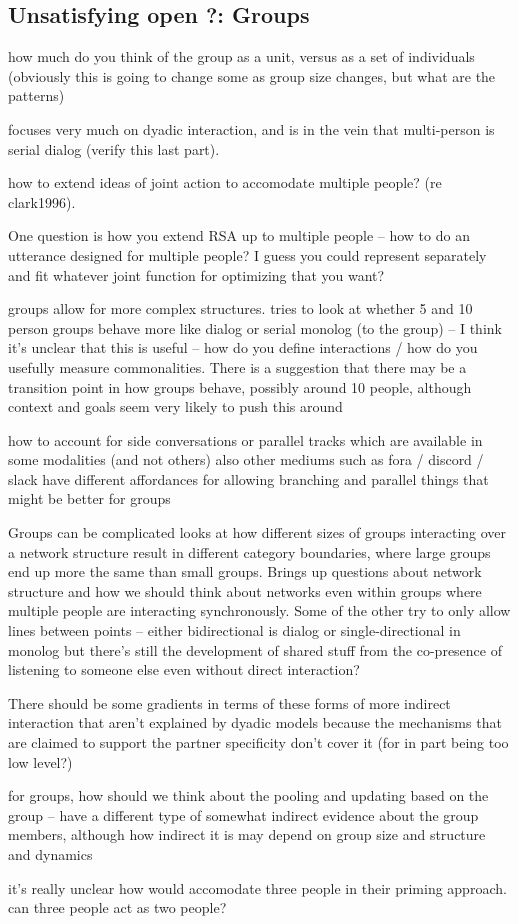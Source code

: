 \documentclass[]{article}
\begin{document}
\subsection{Unsatisfying open ?: Groups}


\cite{yoon2019} how much do you think of the group as a unit, versus as a set of individuals (obviously this is going to change some as group size changes, but what are the patterns) 

\cite{clark1996} focuses very much on dyadic interaction, and is in the vein that multi-person is serial dialog (verify this last part). 

how to extend ideas of joint action to accomodate multiple people? (re clark1996). 

One question is how you extend RSA up to multiple people -- how to do an utterance designed for multiple people? I guess you could represent separately and fit whatever joint function for optimizing that you want? 

groups allow for more complex structures. \cite{fay2000} tries to look at whether 5 and 10 person groups behave more like dialog or serial monolog (to the group) -- I think it's unclear that this is useful -- how do you define interactions / how do you usefully measure commonalities. There is a suggestion that there may be a transition point in how groups behave, possibly around 10 people, although context and goals seem very likely to push this around 

how to account for side conversations or parallel tracks which are available in some modalities (and not others) also other mediums such as fora / discord / slack have different affordances for allowing branching and parallel things that might be better for groups 

Groups can be complicated \cite{guilbeault2021} looks at how different sizes of groups interacting over a network structure result in different category boundaries, where large groups end up more the same than small groups. Brings up questions about network structure and how we should think about networks even within groups where multiple people are interacting synchronously. Some of the other try to only allow lines between points -- either bidirectional is dialog or single-directional in monolog but there's still the development of shared stuff from the co-presence of listening to someone else even without direct interaction? 

There should be some gradients in terms of these forms of more indirect interaction that aren't explained by dyadic models because the mechanisms that are claimed to support the partner specificity don't cover it (for in part being too low level?)

\cite{hawkins2021} for groups, how should we think about the pooling and updating based on the group -- have a different type of somewhat indirect evidence about the group members, although how indirect it is may depend on group size and structure and dynamics 

it's really unclear how \cite{pickering2004} would accomodate three people in their priming approach. can three people act as two people? 



\end{document}
